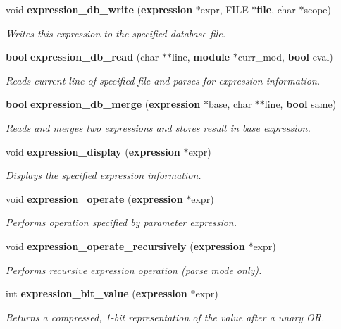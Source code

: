\begin{CompactItemize}
void {\bf expression\_\-db\_\-write} ({\bf expression} $\ast$expr, FILE $\ast${\bf file}, char $\ast$scope)
\begin{CompactList}\small\item\em Writes this expression to the specified database file. \item\end{CompactList}\item 
{\bf bool} {\bf expression\_\-db\_\-read} (char $\ast$$\ast$line, {\bf module} $\ast$curr\_\-mod, {\bf bool} eval)
\begin{CompactList}\small\item\em Reads current line of specified file and parses for expression information. \item\end{CompactList}\item 
{\bf bool} {\bf expression\_\-db\_\-merge} ({\bf expression} $\ast$base, char $\ast$$\ast$line, {\bf bool} same)
\begin{CompactList}\small\item\em Reads and merges two expressions and stores result in base expression. \item\end{CompactList}\item 
void {\bf expression\_\-display} ({\bf expression} $\ast$expr)
\begin{CompactList}\small\item\em Displays the specified expression information. \item\end{CompactList}\item 
void {\bf expression\_\-operate} ({\bf expression} $\ast$expr)
\begin{CompactList}\small\item\em Performs operation specified by parameter expression. \item\end{CompactList}\item 
void {\bf expression\_\-operate\_\-recursively} ({\bf expression} $\ast$expr)
\begin{CompactList}\small\item\em Performs recursive expression operation (parse mode only). \item\end{CompactList}\item 
int {\bf expression\_\-bit\_\-value} ({\bf expression} $\ast$expr)
\begin{CompactList}\small\item\em Returns a compressed, 1-bit representation of the value after a unary OR. \item\end{CompactList}\item 

\end{CompactItemize}
